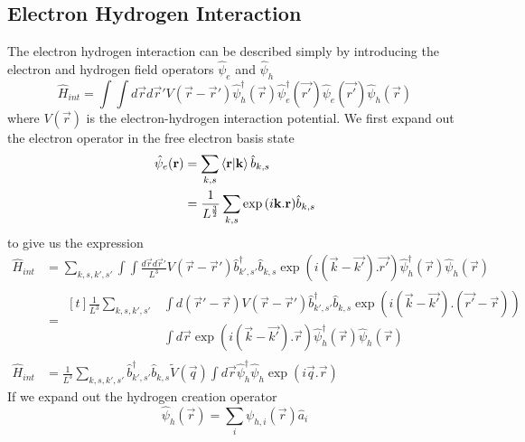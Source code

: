 \subsection{Electron Hydrogen Interaction}
The electron hydrogen interaction can
be described simply by introducing
the electron and hydrogen field
operators \(\hat{\psi}_e\) and
\(\hat{\psi}_h\)~\cite{nazarov_danon_2013}
\begin{equation}
    \hat{H}_{int} = \int\int{d\vec{r} d\vec{r}'
        V(\vec{r}-\vec{r}')
        \hat{\psi}^\dagger_h(\vec{r})
        \hat{\psi}^\dagger_e(\vec{r'})
        \hat{\psi}_e(\vec{r'})
        \hat{\psi}_h(\vec{r})}
\end{equation}
where \(V(\vec{r})\) is
the electron-hydrogen
interaction potential.
We first expand out the
electron operator in
the free electron basis state
\begin{align}
    \hat{\psi}_e(\mathbf{r}) & = \sum_{k, s}
    \braket{\mathbf{r}|\mathbf{k}}
    \hat{b}_{k, s}                                      \\
                          & = \frac{1}{L^{\frac{3}{2}}}
    \sum_{k, s} \exp{(i\mathbf{k}.\mathbf{r})}
    \hat{b}_{k, s}
\end{align}
to give us the expression
\begin{align}
    \hat{H}_{int} & =
    \sum_{k, s, k', s'} \int\int{\frac{d\vec{r} d\vec{r}'}{L^3}
        V(\vec{r}-\vec{r}')
        \hat{b}^\dagger_{k',s'}
        \hat{b}_{k, s}
        \exp{(i(\vec{k} - \vec{k'}).\vec{r'})}
        \hat{\psi}^\dagger_h(\vec{r})
    \hat{\psi}_h(\vec{r})}                       \\
                  & = \begin{aligned}[t]
        \frac{1}{L^3}
        \sum_{k, s, k', s'}
         & \int d(\vec{r}' - \vec{r})
        V(\vec{r}-\vec{r}')
        \hat{b}^\dagger_{k',s'}
        \hat{b}_{k, s}
        \exp{(i(\vec{k} - \vec{k'}).(\vec{r'} - \vec{r}))} \\
         & \int d\vec{r}
        \exp{(i(\vec{k} - \vec{k'}).\vec{r})}
        \hat{\psi}^\dagger_h(\vec{r})
        \hat{\psi}_h(\vec{r})
    \end{aligned} \\
    \hat{H}_{int} & = \frac{1}{L^3}
    \sum_{k,s,k',s'}
    \hat{b}^\dagger_{k',s'}\hat{b}_{k,s}
    \tilde{V}(\vec{q})\int{d\vec{r}
    \hat{\psi}_h^{\dagger}\hat{\psi}_h
    \exp(i\vec{q}.\vec{r})}
\end{align}
If we expand out the
hydrogen creation operator
\begin{equation}
    \hat{\psi}_h(\vec{r}) =
    \sum_{i} \psi_{h,i}(\vec{r})
    \hat{a}_i
\end{equation}
